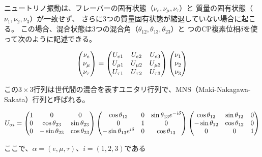 \documentclass[report]{jlreq}
\begin{document}
ニュートリノ振動は、フレーバーの固有状態（$\nu_{e}, \nu_{\mu}, \nu_{\tau}$）と
質量の固有状態（$\nu_{1}, \nu_{2}, \nu_{3}$）が一致せず、
さらに3つの質量固有状態が縮退していない場合に起こる。
この場合、混合状態は3つの混合角（$\theta_{12}, \theta_{13}, \theta_{23}$）と
つのCP複素位相$\delta$を使って次のように記述できる。

\begin{align}
    \pmqty{ \nu_{e} \\ \nu_{\mu} \\ \nu_{\tau} }
    =
    \pmqty{
        U_{e 1} & U_{e 2} & U_{e 3} \\
        U_{\mu 1} & U_{\mu 2} & U_{\mu 3} \\
        U_{\tau 1} & U_{\tau 2} & U_{\tau 3}
    }
    \pmqty{ \nu_{1} \\ \nu_{2} \\ \nu_{3} }
\end{align}

この$3 \times 3$行列は世代間の混合を表すユニタリ行列で、MNS（Maki-Nakagawa-Sakata）行列と呼ばれる。

\begin{align}
U_{\alpha i} =
\pmqty{
    1 & 0 & 0\\
    0 & \cos \theta_{23} & \sin \theta_{23}\\
    0 & - \sin \theta_{23} & \cos \theta_{23}
}
\pmqty{
    \cos \theta_{13} & 0 & \sin \theta_{13} e^{-i \delta}\\
    0 & 1 & 0\\
    - \sin \theta_{13} e^{i \delta} & 0 & \cos \theta_{13}
}
\pmqty{
    \cos \theta_{12} & \sin \theta_{12} & 0\\
    - \sin \theta_{12} & \cos \theta_{12} & 0\\
    0 & 0 & 1
}
\end{align}

ここで、$\alpha = (e, \mu, \tau)$、$i = (1, 2, 3)$である
\end{document}
